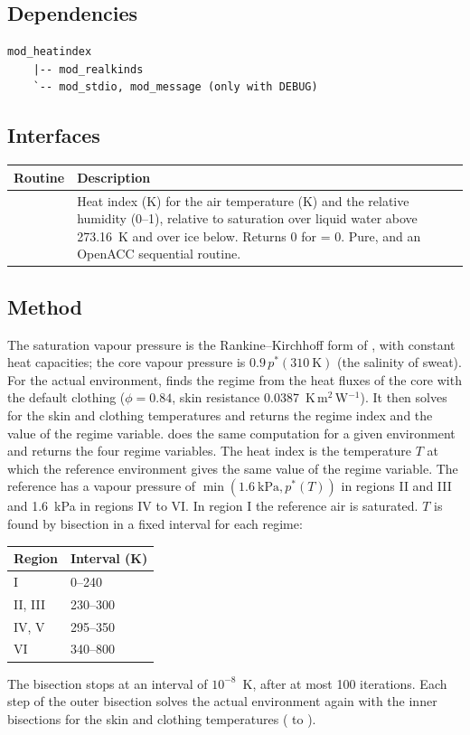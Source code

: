 \subsection{Dependencies}

\begin{lstlisting}
mod_heatindex
    |-- mod_realkinds
    `-- mod_stdio, mod_message (only with DEBUG)
\end{lstlisting}

\subsection{Interfaces}

\begin{longtable}{L{4cm} L{10cm}}
  \toprule
  \textbf{Routine} & \textbf{Description} \\
  \midrule
  \endhead
  \bottomrule
  \endfoot
   &
    Heat index (K) for the air temperature  (K) and the relative
    humidity  (0--1), relative to saturation over liquid water
    above 273.16~K and over ice below. Returns 0 for  = 0. Pure,
    and an OpenACC sequential routine. \\
\end{longtable}

\subsection{Method}

The saturation vapour pressure is the Rankine--Kirchhoff form of
\citet{lu2022}, with constant heat capacities; the core vapour pressure is
$0.9\,p^*(310~\text{K})$ (the salinity of sweat). For the actual
environment,  finds the regime from the heat
fluxes of the core with the default clothing ($\phi = 0.84$, skin
resistance 0.0387~K\,m$^2$\,W$^{-1}$). It then solves for the skin and
clothing temperatures and returns the regime index and the value of the
regime variable.  does the same computation for a
given environment and returns the four regime variables. The heat index
is the temperature $T$ at which the reference environment gives the same
value of the regime variable. The reference has a vapour pressure of
$\min(1.6~\text{kPa}, p^*(T))$ in regions II and III and 1.6~kPa in
regions IV to VI. In region I the reference air is saturated. $T$ is
found by bisection in a fixed interval for each regime:
\begin{longtable}{L{3cm} L{3cm}}
  \toprule
  \textbf{Region} & \textbf{Interval (K)} \\
  \midrule
  \endhead
  \bottomrule
  \endfoot
  I & 0--240 \\
  II, III & 230--300 \\
  IV, V & 295--350 \\
  VI & 340--800 \\
\end{longtable}
\noindent The bisection stops at an interval of $10^{-8}$~K, after at most
100 iterations. Each step of the outer bisection solves the actual
environment again with the inner bisections for the skin and clothing
temperatures ( to ).

